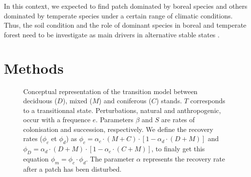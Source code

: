 
In this context, we expected to find patch dominated by boreal species and
others dominated by temperate species under a certain range of climatic
conditions. Thus, the soil condition and the role of dominant species in
boreal and temperate forest need to be investigate as main drivers in
alternative stable states
\cite{Kellman2004,Moore2008,DeFrenne2013,Barras1998}.



\section{Methods}   

\begin{figure}         
	
	\caption{Conceptual representation of the transition model between deciduous ($D$),
	mixed ($M$) and coniferous ($C$) stands. $T$ corresponds to a transitionnal state. 
	Perturbations, natural and anthropogenic,  occur with a frequence $e$. Parameters $\beta$
	and $S$ are rates of colonisation and succession,
	respectively. We define the recovery rates ($\phi_c$ et $\phi_d$) as $\phi_c
	= \alpha_c \cdot (M+C) \cdot [1- \alpha_d \cdot (D +M)]$ and $\phi_D =
	\alpha_d \cdot (D+M) \cdot [1- \alpha_c \cdot (C +M)]$, to finaly get this
	equation $\phi_m = \phi_c \cdot \phi_d$. The parameter $\alpha$ represents the 
	recovery rate after a patch has been disturbed.}         
	\label{Model}
\end{figure}

